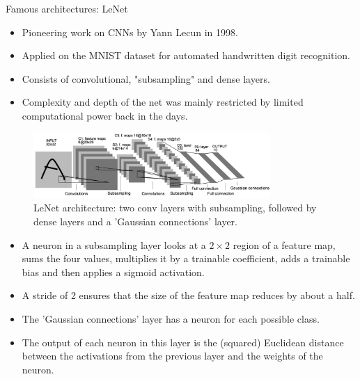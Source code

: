 \begin{vbframe}{Famous architectures: LeNet}
  \begin{itemize}
    \item Pioneering work on CNNs by Yann Lecun in 1998. 
    \item Applied on the MNIST dataset for automated handwritten digit recognition.
    \item Consists of convolutional, "subsampling" and dense layers.
    \item Complexity and depth of the net was mainly restricted by limited computational power back in the days.
  \end{itemize}
  \begin{figure}
  \centering
    \includegraphics[width=9cm]{plots/architectures/lenet.png}
    \caption{LeNet architecture: two conv layers with subsampling, followed by dense layers and a 'Gaussian connections' layer.}
  \end{figure}
  \framebreak
  
  
  \begin{itemize}
    \item A neuron in a subsampling layer looks at a $2 \times 2$ region of a feature map, sums the four values, multiplies it by a trainable coefficient, adds a trainable bias and then applies a sigmoid activation.
    \item A stride of 2 ensures that the size of the feature map reduces by about a half.
    \item The 'Gaussian connections' layer has a neuron for each possible class. 
    \item The output of each neuron in this layer is the (squared) Euclidean distance between the activations from the previous layer and the weights of the neuron.
  \end{itemize}
\end{vbframe}
